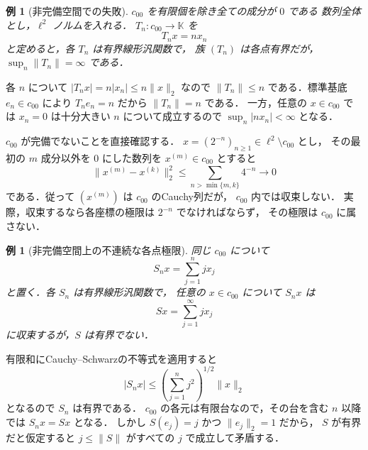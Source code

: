 \documentclass[a5paper,10pt,onecolumn]{jsarticle}
\makeatletter
\theoremstyle{mathnotetheorem}
\newtheorem{example}[theorem]{例}
\renewcommand{\proofname}{証明}
\renewenvironment{proof}[1][\proofname]{%
  \par\pushQED{\qed}\normalfont\topsep4\p@\@plus2\p@\relax
  \trivlist\item[\hskip\labelsep\bfseries #1]\ignorespaces
}{\popQED\endtrivlist\@endpefalse}
\makeatother
\begin{document}
\begin{example}[非完備空間での失敗]\label{ex:c00}
$c_{00}$ を有限個を除き全ての成分が $0$ である
数列全体とし，$\ell^2$ ノルムを入れる．
$T_n:c_{00}\to\mathbb K$ を
\[
 T_nx=n x_n
\]
と定めると，各 $T_n$ は有界線形汎関数で，
族 $(T_n)$ は各点有界だが，
$\sup_n\|T_n\|=\infty$ である．
\end{example}
\begin{proof}
各 $n$ について
$|T_nx|=n|x_n|\le n\|x\|_2$ なので
$\|T_n\|\le n$ である．標準基底 $e_n\in c_{00}$ により
$T_ne_n=n$ だから $\|T_n\|=n$ である．
一方，任意の $x\in c_{00}$ では
$x_n=0$ は十分大きい $n$ について成立するので
$\sup_n|nx_n|<\infty$ となる．

$c_{00}$ が完備でないことを直接確認する．
$x=(2^{-n})_{n\ge1}\in\ell^2\setminus c_{00}$ とし，
その最初の $m$ 成分以外を $0$ にした数列を
$x^{(m)}\in c_{00}$ とすると
\[
 \|x^{(m)}-x^{(k)}\|_2^2
 \le\sum_{n>\min\{m,k\}}4^{-n}\longrightarrow0
\]
である．従って $(x^{(m)})$ は $c_{00}$ のCauchy列だが，
$c_{00}$ 内では収束しない．
実際，収束するなら各座標の極限は $2^{-n}$ でなければならず，
その極限は $c_{00}$ に属さない．
\end{proof}

\begin{example}[非完備空間上の不連続な各点極限]
同じ $c_{00}$ について
\[
 S_nx=\sum_{j=1}^n jx_j
\]
と置く．各 $S_n$ は有界線形汎関数で，
任意の $x\in c_{00}$ について $S_nx$ は
\[
 Sx=\sum_{j=1}^\infty jx_j
\]
に収束するが，$S$ は有界でない．
\end{example}
\begin{proof}
有限和にCauchy--Schwarzの不等式を適用すると
\[
 |S_nx|\le\left(\sum_{j=1}^n j^2\right)^{1/2}\|x\|_2
\]
となるので $S_n$ は有界である．
$c_{00}$ の各元は有限台なので，その台を含む $n$ 以降では
$S_nx=Sx$ となる．
しかし $S(e_j)=j$ かつ $\|e_j\|_2=1$ だから，
$S$ が有界だと仮定すると
$j\le\|S\|$ がすべての $j$ で成立して矛盾する．
\end{proof}
\end{document}
